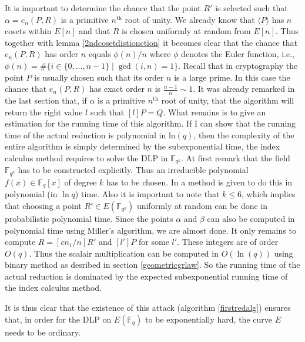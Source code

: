 \documentclass{article}
\numberwithin{equation}{section}
\theoremstyle{definition}
\newcommand{\FF}[1]{{\mathbb F}_{#1}} %
\newcommand{\grgen}[1]{\langle #1 \rangle} %
\begin{document}
It is important to determine the chance that the point $R'$ is selected such that $\alpha=e_n(P,R)$ is a primitive $n^\text{th}$ root of unity. We already know that $\grgen{P}$ has $n$ cosets within $E[n]$ and that $R$ is chosen uniformly at random from $E[n]$. Thus together with lemma \ref{2ndcosetdistionction} it becomes clear that the chance that $e_n(P,R)$ has order $n$ equals $\phi(n)/n$ where $\phi$ denotes the Euler function, i.e., $\phi(n) = \#\{i \in \{0,\ldots ,n-1\}\; | \; \gcd(i,n)=1\}$. Recall that in cryptography the point $P$ is usually chosen such that its order $n$ is a large prime. In this case the chance that $e_n(P,R)$ has exact order $n$ is $\frac{n-1}{n} \sim 1$. It was already remarked in the last section that, if $\alpha$ is a primitive $n^\text{th}$ root of unity, that the algorithm will return the right value $l$ such that $[l]P=Q$. What remains is to give an estimation for the running time of this algorithm. If I can show that the running time of the actual reduction is polynomial in ln$(q)$, then the complexity of the entire algorithm is simply determined by the subexponential time, the index calculus method requires to solve the DLP in $\FF{q^k}$. At first remark that the field $\FF{q^k}$ has to be constructed explicitly. Thus an irreducible polynomial $f(x)\in\FF{q}[x]$ of degree $k$ has to be chosen. In \cite{Ben-OR} a method is given to do this in polynomial (in $\ln q$) time.  Also it is important to note that $k\leq 6$, which implies that choosing a point $R'\in E(\FF{q^k})$ uniformly at random can be done in probabilistic polynomial time. Since the points $\alpha$ and $\beta$ can also be computed in polynomial time using Miller's algorithm, we are almost done. It only remains to compute $R=[cn_1/n]R'$ and $[l']P$ for some $l'$. These integers are of order $O(q)$. Thus the scalair multiplication can be computed in $O(\ln (q))$ using binary method as desribed in section \ref{geometricgrlaw}. So the running time of the actual reduction is dominated by the expected subexponential running time of the index calculus method.\par 
It is thus clear that the existence of this attack (algorithm \ref{firstredalg}) ensures that, in order for the DLP on $E(\FF{q})$ to be exponentially hard, the curve $E$ needs to be ordinary. \newpage
\end{document}
